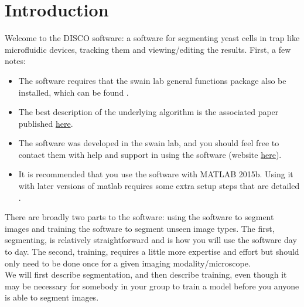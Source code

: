 \section{Introduction}
\label{sec:intro}
 
 Welcome to the DISCO software: a software for segmenting yeast cells in trap like microfluidic devices, tracking them and viewing/editing the results. First, a few notes:
 \begin{itemize}
 	\item The software requires that the swain lab general functions package also be installed, which can be found .
 	\item The best description of the underlying algorithm is the associated paper published \href{https://academic.oup.com/bioinformatics/article-abstract/doi/10.1093/bioinformatics/btx550/4103414?redirectedFrom=fulltext}{here}.
 	\item The software was developed in the swain lab, and you should feel free to contact them with help and support in using the software (website \href{http://swainlab.bio.ed.ac.uk/}{here}).
 	\item It is recommended that you use the software with MATLAB 2015b. Using it with later versions of matlab requires some extra setup steps that are detailed .
 \end{itemize}
 
 There are broadly two parts to the software: using the software to segment images and training the software to segment unseen image types. The first, segmenting, is relatively straightforward and is how you will use the software day to day. The second, training, requires a little more expertise and effort but should only need to be done once for a given imaging modality/microscope. \\
 We will first describe segmentation, and then describe training, even though it may be necessary for somebody in your group to train a model before you anyone is able to segment images.